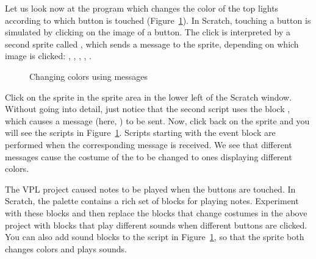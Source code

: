 


Let us look now at the program  which changes the color of
the top lights according to which button is touched
(Figure~\ref{fig.colors}). In Scratch, touching a button is simulated by
clicking on the image of a button. The click is interpreted by a second
sprite called , which sends a message to the  sprite,
depending on which image is clicked: , , ,
, .

\begin{figure}
\caption{Changing colors using messages}\label{fig.colors}
\end{figure}

Click on the  sprite in the sprite area in the lower left of
the Scratch window. Without going into detail, just notice that the
second script uses the block , which causes
a message (here, ) to be sent. Now, click back on the 
sprite and you will see the scripts in Figure~\ref{fig.colors}. Scripts
starting with the event block  are performed when
the corresponding message is received. We see that different messages
cause the costume of the  to be changed to ones displaying
different colors.



The VPL project  caused notes to be played when the buttons
are touched. In Scratch, the  palette contains a rich set of
blocks for playing notes. Experiment with these blocks and then replace
the blocks that change costumes in the above project with blocks that
play different sounds when different buttons are clicked. You can also
add sound blocks to the script in Figure~\ref{fig.colors}, so that the
sprite both changes colors and plays sounds.
